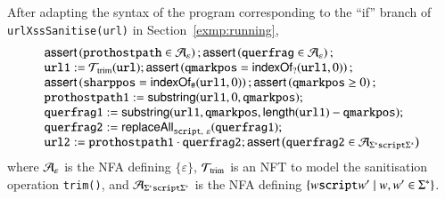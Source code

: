 \begin{example}\label{exmp:logic}
After adapting the syntax of the program corresponding to the ``if'' branch of {\tt urlXssSanitise(url)} in Section~\ref{exmp:running}, %
\[ 
\begin{array}{l}
    \ASSERT{\mathtt{prothostpath} \in \NFA_\varepsilon}; \ASSERT{\mathtt{querfrag} \in \NFA_\varepsilon};\\
    \mathtt{url1} := \NFT_{\rm trim}(\mathtt{url}); \ASSERT{\mathtt{qmarkpos} = \indexof_?(\mathtt{url1},0)};\\
    \ASSERT{\mathtt{sharppos} = \indexof_{\#}(\mathtt{url1}, 0)}; \ASSERT{\mathtt{qmarkpos} \ge 0};\\ 
    \mathtt{prothostpath1} := \substring(\mathtt{url1}, 0, \mathtt{qmarkpos});\\
   \mathtt{querfrag1} := \substring(\mathtt{url1, qmarkpos}, \length(\mathtt{url1}) - \mathtt{qmarkpos});\\
    \mathtt{querfrag2} := \replaceall_{\mathtt{script},\ \varepsilon}(\mathtt{querfrag1});\\
    \mathtt{url2} := \mathtt{prothostpath1} \concat \mathtt{querfrag2};\ASSERT{\mathtt{querfrag2} \in \NFA_{\Sigma^*\mathtt{script}\Sigma^*}}
\end{array}
\]
where $\mathcal{A}_\varepsilon$ is the NFA defining $\{\varepsilon\}$, $\mathcal{T}_{\rm trim}$ is an NFT to model the sanitisation operation {\tt trim()}, and $ \mathcal{A}_{\Sigma^*\mathtt{script}\Sigma^*}$ is the NFA defining $\{w\mbox{\tt script} w' \mid w, w' \in \Sigma^*\}$. 
%
%
\end{example}


